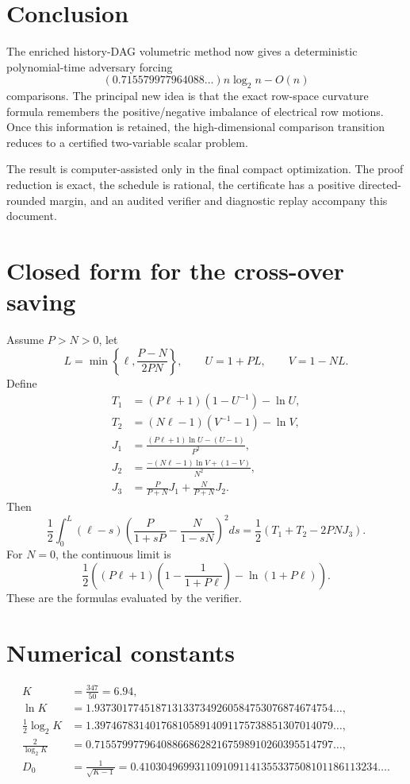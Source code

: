 \documentclass[11pt]{article}
\theoremstyle{definition}
\begin{document}
\section{Conclusion}

The enriched history-DAG volumetric method now gives a deterministic polynomial-time adversary forcing
\[
  \boxed{
  \left(0.715579977964088\ldots\right)n\log_2n-O(n)
  }
\]
comparisons.  The principal new idea is that the exact row-space curvature formula remembers the positive/negative imbalance of electrical row motions.  Once this information is retained, the high-dimensional comparison transition reduces to a certified two-variable scalar problem.

The result is computer-assisted only in the final compact optimization.  The proof reduction is exact, the schedule is rational, the certificate has a positive directed-rounded margin, and an audited verifier and diagnostic replay accompany this document.

\appendix

\section{Closed form for the cross-over saving}
\label{app:gamma-closed-form}
Assume $P>N>0$, let
\[
  L=\min\left\{\ell,\frac{P-N}{2PN}\right\},
  \qquad
  U=1+PL,
  \qquad
  V=1-NL.
\]
Define
\begin{align*}
  T_1&=(P\ell+1)(1-U^{-1})-\ln U,\\
  T_2&=(N\ell-1)(V^{-1}-1)-\ln V,\\
  J_1&=\frac{(P\ell+1)\ln U-(U-1)}{P^2},\\
  J_2&=\frac{-(N\ell-1)\ln V+(1-V)}{N^2},\\
  J_3&=\frac{P}{P+N}J_1+\frac{N}{P+N}J_2.
\end{align*}
Then
\begin{equation}
  \frac12\int_0^L(\ell-s)
  \left(\frac{P}{1+sP}-\frac{N}{1-sN}\right)^2ds
  =\frac12\left(T_1+T_2-2PNJ_3\right).
  \label{eq:Gamma-closed}
\end{equation}
For $N=0$, the continuous limit is
\begin{equation}
  \frac12\left((P\ell+1)\left(1-\frac1{1+P\ell}\right)-\ln(1+P\ell)\right).
  \label{eq:Gamma-N0}
\end{equation}
These are the formulas evaluated by the verifier.

\section{Numerical constants}
\begin{align*}
  K&=\frac{347}{50}=6.94,\\
  \ln K&=1.9373017745187131337349260584753076874674754\ldots,\\
  \frac12\log_2K&=1.3974678314017681058914091175738851307014079\ldots,\\
  \frac{2}{\log_2K}&=0.7155799779640886686282167598910260395514797\ldots,\\
  D_0&=\frac1{\sqrt{K-1}}=0.4103049699311091091141355337508101186113234\ldots.
\end{align*}
\end{document}
